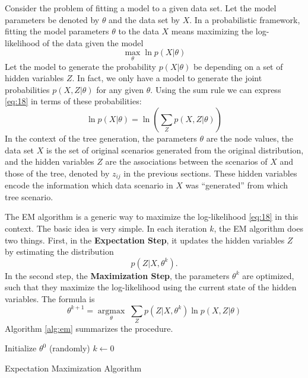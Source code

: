 Consider the problem of fitting a model to a given data set.
Let the model parameters be denoted by $\theta$ and the data set by $X$.
In a probabilistic framework, fitting the model parameters $\theta$ to the data $X$ means maximizing the log-likelihood of the data given the model
\begin{equation}
  \label{eq:18}
  \max\limits_\theta \ln p(X|\theta)
\end{equation}
Let the model to generate the probability $p(X|\theta)$ be depending on a set of hidden variables $Z$.
In fact, we only have a model to generate the joint probabilities $p(X,Z|\theta)$ for any given $\theta$.
Using the sum rule we can express \eqref{eq:18} in terms of these probabilities:
\begin{equation}
  \label{eq:19}
  \ln p(X|\theta) = \ln\left(\sum_Zp(X,Z|\theta)\right)
\end{equation}
In the context of the tree generation, the parameters $\theta$ are the node values, the data set $X$ is the set of original scenarios generated from the original distribution, and the hidden variables $Z$ are the associations between the scenarios of $X$ and those of the tree, denoted by $z_{ij}$ in the previous sections.
These hidden variables encode the information which data scenario in $X$ was ``generated'' from which tree scenario.

The EM algorithm is a generic way to maximize the log-likelihood \eqref{eq:18} in this context.
The basic idea is very simple.
In each iteration $k$, the EM algorithm does two things.
First, in the \textbf{Expectation Step}, it updates the hidden variables $Z$ by estimating the distribution
\begin{equation}
  \label{eq:20}
  p(Z|X,\theta^k).
\end{equation}
In the second step, the \textbf{Maximization Step}, the parameters $\theta^k$ are optimized, such that they maximize the log-likelihood using the current state of the hidden variables.
The formula is
\begin{equation}
  \label{eq:21}
  \theta^{k+1} = \underset{\theta}{\operatorname{argmax}}\; \sum_Zp(Z|X,\theta^k)\ln p(X,Z|\theta)
\end{equation}
Algorithm \ref{alg:em} summarizes the procedure.
\begin{algorithm}
  Initialize $\theta^0$ (randomly)\;
  $k\leftarrow 0$\;
  \caption{Expectation Maximization Algorithm}
  \label{alg:em}
\end{algorithm}
%
